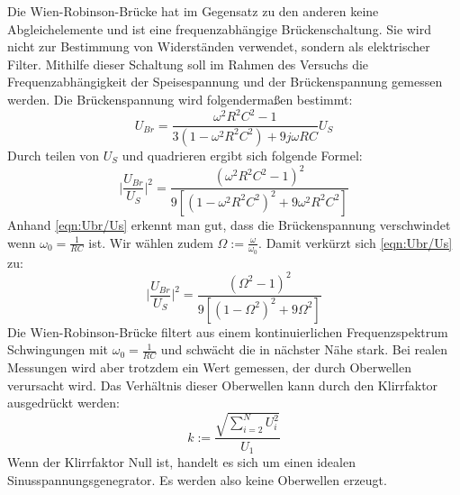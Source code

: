 Die Wien-Robinson-Brücke hat im Gegensatz zu den anderen keine Abgleichelemente und ist eine frequenzabhängige Brückenschaltung. Sie wird
nicht zur Bestimmung von Widerständen verwendet, sondern als elektrischer Filter. Mithilfe dieser Schaltung soll im Rahmen des Versuchs die
Frequenzabhängigkeit der Speisespannung und der Brückenspannung gemessen werden.
Die Brückenspannung wird folgendermaßen bestimmt:
\begin{equation}
    U_{Br} = \frac{\omega ^2 R^2 C^2 - 1}{3(1- \omega ^2 R^2 C^2) + 9 j \omega RC}U_S
\end{equation}
Durch teilen von $U_S$ und quadrieren ergibt sich folgende Formel:
\begin{equation}
    \biggl|\frac{U_{Br}}{U_S}\biggl|^2 = \frac{(\omega ^2 R^2 C^2 - 1)^2}{9[(1- \omega ^2 R^2 C^2)^2 + 9 \omega^2 R^2C^2]} \label{eqn:Ubr/Us}
\end{equation}
Anhand \autoref{eqn:Ubr/Us} erkennt man gut, dass die Brückenspannung verschwindet wenn $\omega_0 = \frac{1}{RC}$ ist. Wir wählen zudem $\Omega := \frac{\omega}{\omega_0}$.
Damit verkürzt sich \autoref{eqn:Ubr/Us} zu:
\begin{equation}
    \biggl|\frac{U_{Br}}{U_S}\biggl|^2 = \frac{(\Omega ^2 - 1)^2}{9[(1-\Omega ^2)^2 + 9 \Omega ^2]} \label{eqn:Omega}
\end{equation}
Die Wien-Robinson-Brücke filtert aus einem kontinuierlichen Frequenzspektrum Schwingungen mit $\omega_0 = \frac{1}{RC}$ und schwächt die in nächster Nähe stark. Bei
realen Messungen wird aber trotzdem ein Wert gemessen, der durch Oberwellen verursacht wird. Das Verhältnis dieser Oberwellen kann durch den Klirrfaktor ausgedrückt werden:
\begin{equation}
    k := \frac{\sqrt{\sum_{i=2}^N U_i^2}}{U_1} \label{eqn:Klirrfaktor}
\end{equation} 
Wenn der Klirrfaktor Null ist, handelt es sich um einen idealen Sinusspannungsgenegrator. Es werden also keine Oberwellen erzeugt.


\newpage